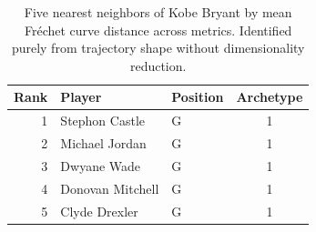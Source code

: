 \begin{table}[htbp]
  \centering\small
  \begin{tabular}{rllc}
    \toprule
    Rank & Player & Position & Archetype \\
    \midrule
    1 & Stephon Castle & G & 1 \\
    2 & Michael Jordan & G & 1 \\
    3 & Dwyane Wade & G & 1 \\
    4 & Donovan Mitchell & G & 1 \\
    5 & Clyde Drexler & G & 1 \\
    \bottomrule
  \end{tabular}
  \caption{Five nearest neighbors of Kobe Bryant by mean Fr\'{e}chet curve distance across metrics. Identified purely from trajectory shape without dimensionality reduction.}
  \label{tab:Kobe_Bryant_frechet_curve_neighbors}
\end{table}

